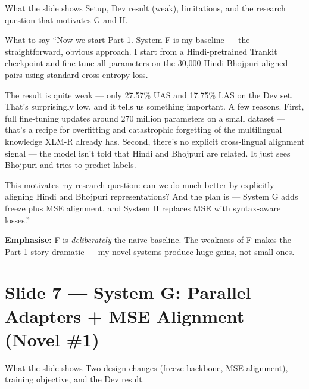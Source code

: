 \documentclass[11pt]{article}
\begin{document}
\begin{pitchbox}{What the slide shows}
Setup, Dev result (weak), limitations, and the research question that motivates G and H.
\end{pitchbox}

\begin{pitchbox}{What to say}
``Now we start Part 1. System F is my baseline --- the straightforward, obvious approach. I start from a Hindi-pretrained Trankit checkpoint and fine-tune all parameters on the 30,000 Hindi-Bhojpuri aligned pairs using standard cross-entropy loss.

The result is quite weak --- only 27.57\% UAS and 17.75\% LAS on the Dev set. That's surprisingly low, and it tells us something important. A few reasons. First, full fine-tuning updates around 270 million parameters on a small dataset --- that's a recipe for overfitting and catastrophic forgetting of the multilingual knowledge XLM-R already has. Second, there's no explicit cross-lingual alignment signal --- the model isn't told that Hindi and Bhojpuri are related. It just sees Bhojpuri and tries to predict labels.

This motivates my research question: can we do much better by explicitly aligning Hindi and Bhojpuri representations? And the plan is --- System G adds freeze plus MSE alignment, and System H replaces MSE with syntax-aware losses.''
\end{pitchbox}

\begin{tipbox}
\textbf{Emphasise:} F is \textit{deliberately} the naive baseline. The weakness of F makes the Part 1 story dramatic --- my novel systems produce huge gains, not small ones.
\end{tipbox}

\section{Slide 7 --- System G: Parallel Adapters + MSE Alignment (Novel \#1)}

\begin{pitchbox}{What the slide shows}
Two design changes (freeze backbone, MSE alignment), training objective, and the Dev result.
\end{pitchbox}
\end{document}
